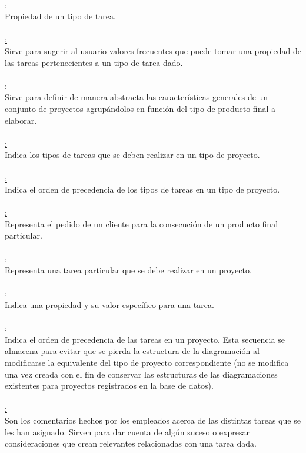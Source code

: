 \documentclass[a4paper, 12pt,twoside]{report}  %
\numberwithin{equation}{subsection} %
\begin{document}
\\
\underline{:}\\
Propiedad de un tipo de tarea.\\
\\
\underline{:}\\
Sirve para sugerir al usuario valores frecuentes que puede tomar una propiedad de las tareas pertenecientes a un tipo de tarea dado.\\
\\
\underline{:}\\
Sirve para definir de manera abstracta las características generales de un conjunto de proyectos agrupándolos en función del tipo de producto final a elaborar.\\
\\
\underline{:}\\
Indica los tipos de tareas que se deben realizar en un tipo de proyecto.\\
\\
\underline{:}\\
Indica el orden de precedencia de los tipos de tareas en un tipo de proyecto.\\
\\
\underline{:}\\
Representa el pedido de un cliente para la consecución de un producto final particular.\\
\\
\underline{:}\\
Representa una tarea particular que se debe realizar en un proyecto.\\
\\
\underline{:}\\
Indica una propiedad y su valor específico para una tarea.\\
\\
\underline{:}\\
Indica el orden de precedencia de las tareas en un proyecto. Esta secuencia se almacena para evitar 	que se pierda la estructura de la diagramación al modificarse la equivalente del tipo de proyecto correspondiente (no se modifica una vez creada con el fin de conservar las estructuras de las diagramaciones existentes para proyectos registrados en la base de datos).\\
\\
\underline{:}\\
Son los comentarios hechos por los empleados acerca de las distintas tareas que se les han asignado. Sirven para dar cuenta de algún suceso o expresar consideraciones que crean relevantes relacionadas con una tarea dada.
\end{document}
